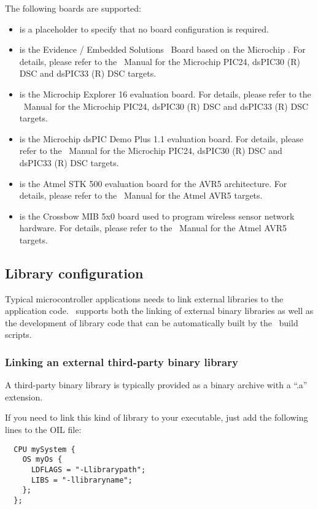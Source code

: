 The following boards are supported:
\begin{itemize}
\item {} is a placeholder to specify that no board
  configuration is required.
\item {} is the Evidence / Embedded Solutions \flex\ Board
  based on the Microchip \dspic. For details, please refer to the
  \ee\ Manual for the Microchip PIC24, dsPIC30 (R) DSC and dsPIC33 (R)
  DSC targets.
\item {} is the Microchip Explorer 16
  evaluation board. For details, please refer to the \ee\ Manual for the
  Microchip PIC24, dsPIC30 (R) DSC and dsPIC33 (R) DSC targets.
\item {} is the Microchip dsPIC Demo Plus
  1.1 evaluation board. For details, please refer to the \ee\ Manual
  for the Microchip PIC24, dsPIC30 (R) DSC and dsPIC33 (R) DSC
  targets.
\item {} is the Atmel STK 500 evaluation board for
  the AVR5 architecture. For details, please refer to the \ee\ Manual
  for the Atmel AVR5 targets.
\item {} is the Crossbow MIB 5x0 board used to program
  wireless sensor network hardware. For details, please refer to the
  \ee\ Manual for the Atmel AVR5 targets.
\end{itemize}

\subsection{Library configuration}
Typical microcontroller applications needs to link external libraries
to the application code. \ee\ supports both the linking of external
binary libraries as well as the development of library code that can
be automatically built by the \ee\ build scripts.

\subsubsection{Linking an external third-party binary library}
A third-party binary library is typically provided as a binary archive
with a ``.a'' extension.

If you need to link this kind of library to your executable, just add
the following lines to the OIL file:
\begin{lstlisting}
  CPU mySystem {
    OS myOs {
      LDFLAGS = "-Llibrarypath";
      LIBS = "-llibraryname";
    };
  };
\end{lstlisting}

